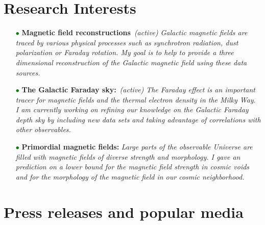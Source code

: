 \documentclass[11pt,a4paper,sans, table, dvipsnames]{moderncv}        %
\begin{document}
\vspace{\baselineskip}
\section{Research Interests}
\begin{itemize}

\item[\textcolor{Green}{$\bullet$}]{\textbf{Magnetic field reconstructions} \,\textit{(active)} \newline \textit{Galactic magnetic fields are traced by various physical processes such as synchrotron radiation, dust polarization or Faraday rotation. My goal is to help to provide a three dimensional reconstruction of the Galactic magnetic field using these data sources. }}

\vspace{3pt}

\item[\textcolor{Green}{$\bullet$}]{\textbf{The Galactic Faraday sky:} \,\textit{(active)}  \newline \textit{The Faraday effect is an important tracer for magnetic fields and the thermal electron density in the Milky Way. I am currently working on refining our knowledge on the Galactic Faraday depth sky by including new data sets and taking advantage of correlations with other observables.}}

\vspace{3pt}

\item[\textcolor{Green}{$\bullet$}]{\textbf{Primordial magnetic fields:}  \newline \textit{Large parts of the observable Universe are filled with magnetic fields of diverse strength and morphology. I gave an prediction on a lower bound for the magnetic field strength in cosmic voids and for the morphology of the magnetic field in our cosmic neighborhood. }}
\end{itemize}

\vspace{\baselineskip}
\section{Press releases and popular media}
\end{document}
